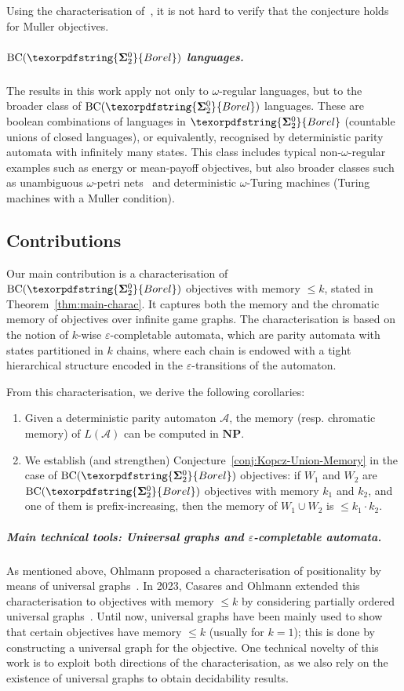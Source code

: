 \documentclass[a4paper,UKenglish,cleveref, thm-restate]{lipics-v2021}
\renewcommand{\epsilon}{\varepsilon}
\newcommand{\eps}{\varepsilon}
\newcommand{\boldclass}[3]{\texorpdfstring{\ensuremath{\mathbf{#1}^{#2}_{#3}}}{Borel}}
\newcommand{\bsigma}[1]{\boldclass{\Sigma}{0}{#1}}
\newcommand{\BCSigma}{\mathrm{BC}(\boldclass{\Sigma}{0}{2})}
\newcommand{\A}{\mathcal{A}}
\newcommand{\NP}{\textbf{NP}}
\newcommand{\oo}{\omega}
\begin{document}
Using the characterisation of~\cite{DJW1997memory}, it is not hard to verify that the conjecture holds for Muller objectives.

\subparagraph*{$\BCSigma$ languages.}

The results in this work apply not only to $\oo$-regular languages, but to the broader class of $\BCSigma$ languages.
These are boolean combinations of languages in $\bsigma 2$ (countable unions of closed languages), or equivalently, recognised by deterministic parity automata with infinitely many states.
This class includes typical non-$\omega$-regular examples such as energy or mean-payoff objectives, but also broader classes such as unambiguous $\oo$-petri nets~\cite{FSJLS22} and deterministic $\oo$-Turing machines (Turing machines with a Muller condition).


\subsection*{Contributions}

Our main contribution is a characterisation of $\BCSigma$ objectives with memory $\leq k$, stated in Theorem~\ref{thm:main-charac}.
It captures both the memory and the chromatic memory of objectives over infinite game graphs.
The characterisation is based on the notion of $k$-wise $\epsilon$-completable automata, which are parity automata with states partitioned in $k$ chains, where each chain is endowed with a tight hierarchical structure encoded in the $\eps$-transitions of the automaton.

From this characterisation, we derive the following corollaries:
\begin{enumerate}
	\item \bfDescript{Decidability in $\NP$.} Given a deterministic parity automaton $\A$, the memory (resp. chromatic memory) of $L(\A)$  can be computed in $\NP$.



	\item {} We establish (and strengthen) Conjecture~\ref{conj:Kopcz-Union-Memory} in the case of $\BCSigma$ objectives: if $W_1$ and $W_2$ are $\BCSigma$ objectives with memory $k_1$ and
	 $k_2$, and one of them is prefix-increasing, then the memory of $W_1 \cup W_2$ is $\leq k_1\cdot k_2$.\end{enumerate}


\subparagraph{Main technical tools: Universal graphs and $\eps$-completable automata.}
As mentioned above, Ohlmann proposed a characterisation of positionality by means of universal graphs~\cite{Ohlmann23}.
In 2023, Casares and Ohlmann extended this characterisation to objectives with memory $\leq k$ by considering partially ordered universal graphs~\cite{CO25LMCS}.
Until now, universal graphs have been mainly used to show that certain objectives have memory $\leq k$ (usually for $k=1$); this is done by constructing a universal graph for the objective.
One technical novelty of this work is to exploit both directions of the characterisation, as we also rely on the existence of universal graphs to obtain decidability results.
\end{document}
